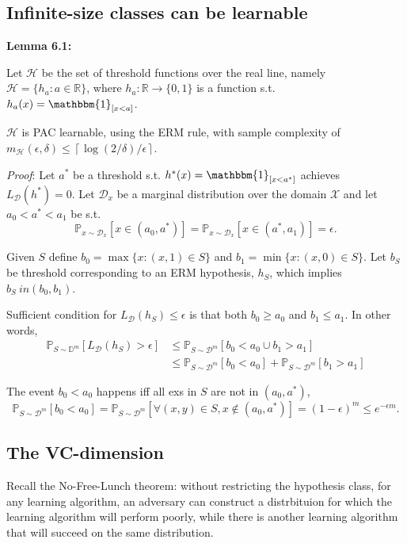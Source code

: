 \subsection{Infinite-size classes can be learnable}

\textbf{Lemma 6.1:}

Let $\mathcal{H}$ be the set of threshold functions over the real line, namely $\mathcal{H} = \{h_a : a \in \mathbb{R}\}$, where $h_a : \mathbb{R} \rightarrow \{0, 1\}$ is a function s.t. $h_a (x) = \mathbbm{1}_{[x < a]}$. 

$\mathcal{H}$ is PAC learnable, using the ERM rule, with sample complexity of $m_{\mathcal{H}}(\epsilon, \delta) \leq \left\lceil \log(2/\delta)/\epsilon \right \rceil$.

\textit{Proof}: Let $a^*$ be a threshold s.t. $h^*(x) = \mathbbm{1}_{[x < a^*]}$ achieves $L_{\mathcal{D}}(h^*) = 0$. Let $\mathcal{D}_x$ be a marginal distribution over the domain $\mathcal{X}$ and let $a_0 < a^* < a_1$ be s.t. $$\mathbb{P}_{x \sim \mathcal{D}_x}[x \in (a_0, a^*)] = \mathbb{P}_{x \sim \mathcal{D}_x}[x \in (a^*, a_1)] = \epsilon.$$

Given $S$ define $b_0 = \max\{x : (x, 1) \in S\}$ and $b_1 = \min\{x: (x, 0) \in S\}$. Let $b_S$ be threshold corresponding to an ERM hypothesis, $h_S$, which implies $b_S \ in (b_0, b_1)$. 

Sufficient condition for $L_{\mathcal{D}}(h_S) \leq \epsilon$ is that both $b_0 \geq a_0$ and $b_1 \leq a_1$. In other words,
\begin{align*}
    \mathbb{P}_{S \sim \mathbb{D}^m}[L_{\mathcal{D}}(h_S) > \epsilon] &\leq \mathbb{P}_{S\sim \mathcal{D}^m}[b_0 < a_0 \cup b_1 > a_1] \\
    & \leq \mathbb{P}_{S\sim \mathcal{D}^m}[b_0 < a_0] + \mathbb{P}_{S \sim \mathcal{D}^m}[b_1 > a_1]
\end{align*}

The event $b_0 < a_0$ happens iff all exs in $S$ are not in $(a_0, a^*)$,
$$\mathbb{P}_{S\sim \mathcal{D}^m}[b_0 < a_0] = \mathbb{P}_{S \sim \mathcal{D}^m} [\forall (x, y) \in S, x \notin (a_0, a^*)] = (1 - \epsilon)^m \leq e^{-\epsilon m}.$$

\subsection{The VC-dimension}

Recall the No-Free-Lunch theorem: without restricting the hypothesis class, for any learning algorithm, an adversary can construct a distrbituion for which the learning algorithm will perform poorly, while there is another learning algorithm that will succeed on the same distribution. 



